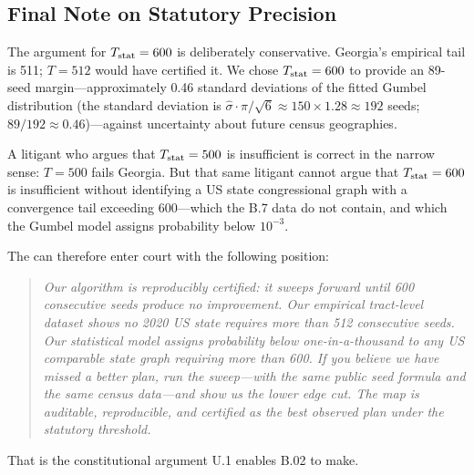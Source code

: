 \subsection{Final Note on Statutory Precision}

The argument for $T_{\mathrm{stat}} = 600$ is deliberately conservative.
Georgia's empirical tail is 511; $T = 512$ would have certified it.
We chose $T_{\mathrm{stat}} = 600$ to provide an 89-seed margin---approximately 0.46
standard deviations of the fitted Gumbel distribution (the standard deviation
is $\hat\sigma \cdot \pi/\sqrt{6} \approx 150 \times 1.28 \approx 192$ seeds;
$89/192 \approx 0.46$)---against uncertainty about future census geographies.

A litigant who argues that $T_{\mathrm{stat}} = 500$ is insufficient is correct in the
narrow sense: $T = 500$ fails Georgia.
But that same litigant cannot argue that $T_{\mathrm{stat}} = 600$ is insufficient without
identifying a US state congressional graph with a convergence tail exceeding
600---which the B.7 data do not contain, and which the Gumbel model assigns
probability below $10^{-3}$.

The \dia{} can therefore enter court with the following position:
\begin{quote}
  \itshape
  Our algorithm is reproducibly certified: it sweeps forward until 600
  consecutive seeds produce no improvement.
  Our empirical tract-level dataset shows no 2020 US state requires more than
  512 consecutive seeds.
  Our statistical model assigns probability below one-in-a-thousand to any US
  comparable state graph requiring more than 600.
  If you believe we have missed a better plan, run the sweep---with the same
  public seed formula and the same census data---and show us the lower edge cut.
  The map is auditable, reproducible, and certified as the best observed plan
  under the statutory threshold.
\end{quote}

That is the constitutional argument U.1 enables B.02 to make.
